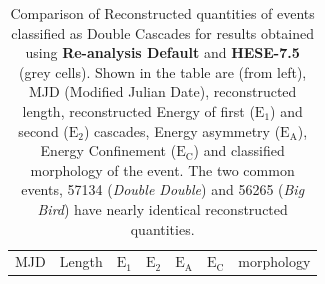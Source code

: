 \begin{table}[h!]
    \caption[Comparison of Reconstructed quantities of re-analysed HESE-7.5 data by using Spice-Bfr ice model with published HESE-7.5 events]{Comparison of Reconstructed quantities of events classified as Double Cascades for results obtained using \textbf{Re-analysis Default} and \textbf{HESE-7.5} (grey cells). Shown in the table are (from left), MJD (Modified Julian Date), reconstructed length, reconstructed Energy of first ($\mathrm{E}_1$) and second ($\mathrm{E}_2$) cascades, Energy asymmetry ($\mathrm{E}_\mathrm{A}$), Energy Confinement ($\mathrm{E}_\mathrm{C}$) and classified morphology of the event. The two common events, 57134 (\emph{Double Double}) and 56265 (\emph{Big Bird}) have nearly identical reconstructed quantities.}
    \begin{tabular}{c|cc|cc|cc|cc|cc|cc}
        \toprule
         MJD    & \multicolumn{2}{c|}{Length}
                
                        & \multicolumn{2}{c|}{$\mathrm{E}_\mathrm{1}$}
                                & \multicolumn{2}{c|}{$\mathrm{E}_\mathrm{2}$} 
                                    & \multicolumn{2}{c|}{$\mathrm{E}_\mathrm{A}$} 
                                        & \multicolumn{2}{c|}{$\mathrm{E}_\mathrm{C}$}  
                                            & \multicolumn{2}{c}{morphology}                \\
                       

\end{tabular}
\end{table}
